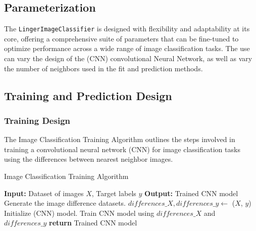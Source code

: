 \documentclass[a4paper, 12pt]{report}
\begin{document}
\subsection{Parameterization}
The \texttt{LingerImageClassifier} is designed with flexibility and adaptability at its core, offering a comprehensive suite of parameters that can be fine-tuned to optimize performance across a wide range of image classification tasks. 
The use can vary the design of the (CNN) convolutional Neural Network, as well as vary the number of neighbors used in the fit and prediction methods.
\subsection{Training and Prediction Design}
\subsubsection{Training Design}

The Image Classification Training Algorithm outlines the steps involved in training a convolutional neural network (CNN) for image 
classification tasks using the differences between nearest neighbor images. 

\begin{algorithm}
    \caption{Image Classification Training Algorithm}
    \label{alg:image_classification_training}
    \begin{algorithmic}
            \State \textbf{Input:} Dataset of images $X$, Target labels $y$
            \State \textbf{Output:} Trained CNN model
            \State Generate the image difference datasets.
            \State $differences\_X, differences\_y \gets$ ($X$, $y$) 
            \State Initialize (CNN) model. 
            \State Train CNN model using $differences\_X$ and $differences\_y$
            \State \textbf{return} Trained CNN model
        \EndFunction
    \end{algorithmic}
\end{algorithm}
\clearpage
\end{document}
